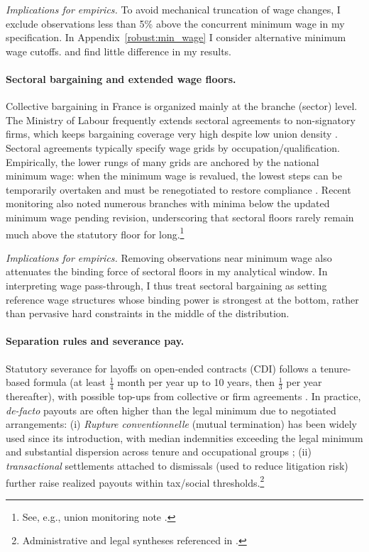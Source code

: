\emph{Implications for empirics.} To avoid mechanical truncation of wage changes, I exclude observations less than 5\% above the concurrent minimum wage in my specification. In Appendix~\ref{robust:min_wage} I consider alternative minimum wage cutoffs. and find little difference in my results.

\paragraph{Sectoral bargaining and extended wage floors.}
Collective bargaining in France is organized mainly at the branche (sector) level. The Ministry of Labour frequently extends sectoral agreements to non-signatory firms, which keeps bargaining coverage very high despite low union density \parencite{oecd_ictwss_france_2025}. Sectoral agreements typically specify wage grids by occupation/qualification. Empirically, the lower rungs of many grids are anchored by the national minimum wage: when the minimum wage is revalued, the lowest steps can be temporarily overtaken and must be renegotiated to restore compliance \parencite{fr_strategie_smic_2024,dares_branch_smic_2018}. Recent monitoring also noted numerous branches with minima below the updated minimum wage pending revision, underscoring that sectoral floors rarely remain much above the statutory floor for long.\footnote{See, e.g., union monitoring note \parencite{fo_minima_2025}.}

\emph{Implications for empirics.} Removing observations near minimum wage also attenuates the binding force of sectoral floors in my analytical window. In interpreting wage pass-through, I thus treat sectoral bargaining as setting reference wage structures whose binding power is strongest at the bottom, rather than pervasive hard constraints in the middle of the distribution.

\paragraph{Separation rules and severance pay.}
Statutory severance for layoffs on open-ended contracts (CDI) follows a tenure-based formula (at least $\tfrac{1}{4}$ month per year up to 10 years, then $\tfrac{1}{3}$ per year thereafter), with possible top-ups from collective or firm agreements \parencite{service_public_severance}. In practice, \emph{de-facto} payouts are often higher than the legal minimum due to negotiated arrangements:
(i) \emph{Rupture conventionnelle} (mutual termination) has been widely used since its introduction, with median indemnities exceeding the legal minimum and substantial dispersion across tenure and occupational groups \parencite{dares_rc_2021};
(ii) \emph{transactional} settlements attached to dismissals (used to reduce litigation risk) further raise realized payouts within tax/social thresholds.\footnote{Administrative and legal syntheses referenced in \parencite{dares_rc_2021}.}

